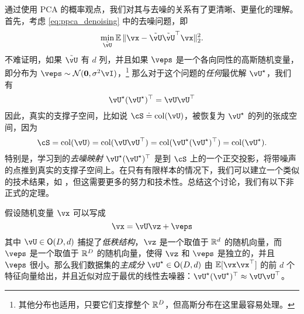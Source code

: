 \documentclass[../../book-main.tex]{subfiles}
\begin{document}
\begin{remark}
    通过使用 PCA 的概率观点，我们对其与去噪的关系有了更清晰、更量化的理解。首先，考虑 \eqref{eq:ppca_denoising} 中的去噪问题，即
    \begin{equation}
        \min_{\tilde{\vU}}\Ex\norm{\vx - \tilde{\vU}\tilde{\vU}^{\top}\vx}_{2}^{2}.
    \end{equation}
    不难证明，如果 $\tilde{\vU}$ 有 $d$ 列，并且如果 \(\veps\) 是一个各向同性的高斯随机变量，即分布为 \(\veps \sim \dNorm(\vzero, \sigma^{2}\vI)\)，\footnote{其他分布也适用，只要它们支撑整个 \(\mathbb{R}^{D}\)，但高斯分布在这里最容易处理。} 那么对于这个问题的\textit{任何}最优解 \(\vU^{\star}\)，我们有
    \begin{equation}
        \vU^{\star}(\vU^{\star})^{\top} = \vU\vU^{\top}
    \end{equation}
    因此，真实的支撑子空间，比如说 \(\cS \doteq \mathop{\mathrm{col}}(\vU)\)，被恢复为 \(\vU^{\star}\) 的列的张成空间，因为
    \begin{equation}
        \cS = \mathop{\mathrm{col}}(\vU) = \mathop{\mathrm{col}}(\vU\vU^{\top})
        = \mathop{\mathrm{col}}(\vU^{\star}(\vU^{\star})^{\top})
        = \mathop{\mathrm{col}}(\vU^{\star}).
    \end{equation}
    特别是，学习到的\textit{去噪映射} \(\vU^{\star}(\vU^{\star})^{\top}\) 是到 \(\cS\) 上的一个正交投影，将带噪声的点推到真实的支撑子空间上。在只有有限样本的情况下，我们可以建立一个类似的技术结果，如 ，但这需要更多的努力和技术性。总结这个讨论，我们有以下非正式的定理。
\end{remark}


\begin{theorem}\label{thm:ppca}
    假设随机变量 \(\vx\) 可以写成
    \begin{equation}
        \vx = \vU\vz + \veps
    \end{equation}
    其中 \(\vU \in \O(D, d)\) 捕捉了\textit{低秩结构}，\(\vz\) 是一个取值于 \(\mathbb{R}^{d}\) 的随机向量，而 \(\veps\) 是一个取值于 \(\mathbb{R}^{D}\) 的随机向量，使得 \(\vz\) 和 \(\veps\) 是独立的，并且 \(\veps\) 很小。那么我们数据集的\textit{主成分} \(\vU^{\star} \in \O(D, d)\) 由 \(\Ex[\vx\vx^{\top}]\) 的前 \(d\) 个特征向量给出，并且近似对应于最优的线性去噪器：\(\vU^{\star}(\vU^{\star})^{\top} \approx \vU\vU^{\top}\)。
\end{theorem}

\end{document}

